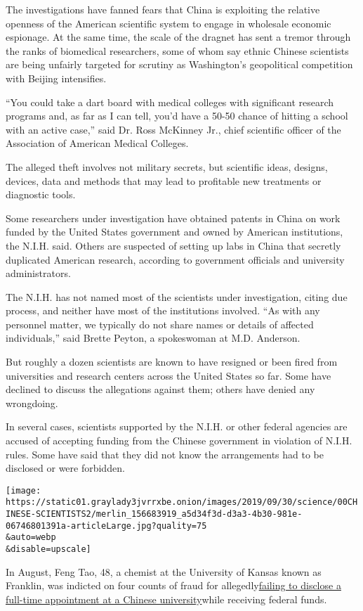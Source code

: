 The investigations have fanned fears that China is exploiting the
relative openness of the American scientific system to engage in
wholesale economic espionage. At the same time, the scale of the dragnet
has sent a tremor through the ranks of biomedical researchers, some of
whom say ethnic Chinese scientists are being unfairly targeted for
scrutiny as Washington's geopolitical competition with Beijing
intensifies.

``You could take a dart board with medical colleges with significant
research programs and, as far as I can tell, you'd have a 50-50 chance
of hitting a school with an active case,'' said Dr. Ross McKinney Jr.,
chief scientific officer of the Association of American Medical
Colleges.

The alleged theft involves not military secrets, but scientific ideas,
designs, devices, data and methods that may lead to profitable new
treatments or diagnostic tools.

Some researchers under investigation have obtained patents in China on
work funded by the United States government and owned by American
institutions, the N.I.H. said. Others are suspected of setting up labs
in China that secretly duplicated American research, according to
government officials and university administrators.

The N.I.H. has not named most of the scientists under investigation,
citing due process, and neither have most of the institutions involved.
``As with any personnel matter, we typically do not share names or
details of affected individuals,'' said Brette Peyton, a spokeswoman at
M.D. Anderson.

But roughly a dozen scientists are known to have resigned or been fired
from universities and research centers across the United States so far.
Some have declined to discuss the allegations against them; others have
denied any wrongdoing.

In several cases, scientists supported by the N.I.H. or other federal
agencies are accused of accepting funding from the Chinese government in
violation of N.I.H. rules. Some have said that they did not know the
arrangements had to be disclosed or were forbidden.

\texttt{[image: https://static01.graylady3jvrrxbe.onion/images/2019/09/30/science/00CHINESE-SCIENTISTS2/merlin\_156683919\_a5d34f3d-d3a3-4b30-981e-06746801391a-articleLarge.jpg?quality=75\\\&auto=webp\\\&disable=upscale]}

In August, Feng Tao, 48, a chemist at the University of Kansas known as
Franklin, was indicted on four counts of fraud for
allegedly\href{https://www.insidehighered.com/news/2019/08/23/kansas-professor-indicted-allegedly-failing-disclose-appointment-chinese-university}{failing
to disclose a full-time appointment at a Chinese university}while
receiving federal funds.

